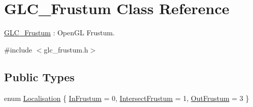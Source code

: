 \hypertarget{class_g_l_c___frustum}{\section{G\-L\-C\-\_\-\-Frustum Class Reference}
\label{class_g_l_c___frustum}
}


\hyperlink{class_g_l_c___frustum}{G\-L\-C\-\_\-\-Frustum} \-: Open\-G\-L Frustum.  




{\ttfamily \#include $<$glc\-\_\-frustum.\-h$>$}

\subsection*{Public Types}
\begin{DoxyCompactItemize}
\item 
enum \hyperlink{class_g_l_c___frustum_a37926b89a9da497fc35c6ce746fc00cd}{Localisation} \{ \hyperlink{class_g_l_c___frustum_a37926b89a9da497fc35c6ce746fc00cda97cf5f818185711f6b2ac689194d1c70}{In\-Frustum} = 0, 
\hyperlink{class_g_l_c___frustum_a37926b89a9da497fc35c6ce746fc00cdafa43271baac6dfbf38a8b39e1cb89f8b}{Intersect\-Frustum} = 1, 
\hyperlink{class_g_l_c___frustum_a37926b89a9da497fc35c6ce746fc00cdacf620931975f342e7ee7cebc2282976f}{Out\-Frustum} = 3
 \}
\end{DoxyCompactItemize}
